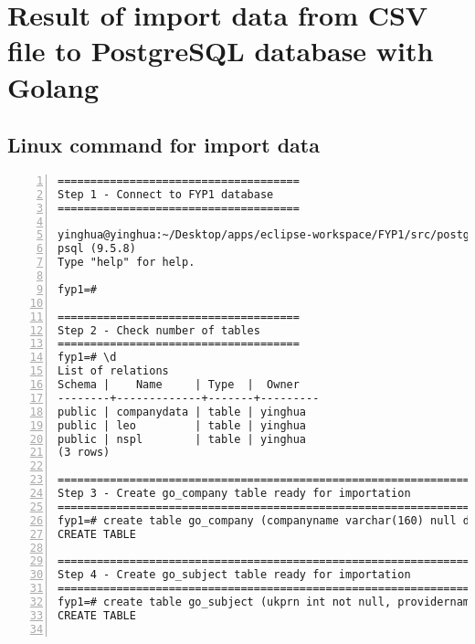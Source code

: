 \chapter{Result of import data from CSV file to PostgreSQL database with Golang} 
\label{AppendixH} 


\section {Linux command for import data}

\lstset{basicstyle=\ttfamily\tiny}  
\begin{lstlisting}[breaklines, frame=single, numbers=left, caption={Linux command for import data}, label=commandline-02]
=====================================
Step 1 - Connect to FYP1 database
=====================================

yinghua@yinghua:~/Desktop/apps/eclipse-workspace/FYP1/src/postgres-process$ psql fyp1;
psql (9.5.8)
Type "help" for help.

fyp1=#

=====================================
Step 2 - Check number of tables
=====================================
fyp1=# \d
List of relations
Schema |    Name     | Type  |  Owner  
--------+-------------+-------+---------
public | companydata | table | yinghua
public | leo         | table | yinghua
public | nspl        | table | yinghua
(3 rows)

==================================================================
Step 3 - Create go_company table ready for importation 
==================================================================
fyp1=# create table go_company (companyname varchar(160) null default null, companynumber varchar(8) not null primary key, companycategory varchar(100) not null, companystatus varchar(70) not null, countryoforigin varchar(50) not null );
CREATE TABLE

==================================================================
Step 4 - Create go_subject table ready for importation 
==================================================================
fyp1=# create table go_subject (ukprn int not null, providername varchar(100) not null, region varchar(100) not null, subject varchar(50) not null, sex varchar(30) not null ); 
CREATE TABLE


\end{lstlisting}

